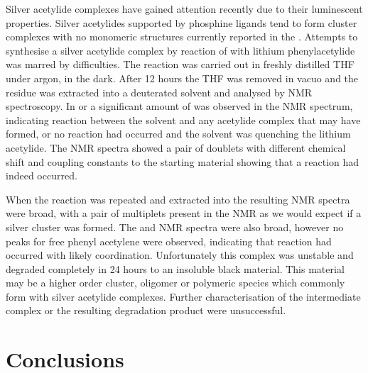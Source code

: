 Silver acetylide complexes have gained attention recently due to their luminescent properties.\cite{Yam1997, Yam1998, Xu2013}  Silver acetylides supported by phosphine ligands tend to form cluster complexes with no monomeric structures currently reported in the .  Attempts to synthesise a silver acetylide complex by reaction of  with lithium phenylacetylide was marred by difficulties.  The reaction was carried out in freshly distilled THF under argon, in the dark.  After 12 hours the THF was removed in vacuo and the residue was extracted into a deuterated solvent and analysed by NMR spectroscopy.  In  or  a significant amount of  was observed in the \carbon{} NMR spectrum, indicating reaction between the solvent and any acetylide complex that may have formed, or no reaction had occurred and the solvent was quenching the lithium acetylide.  The \phosphorus{} NMR spectra showed a pair of doublets with different chemical shift and coupling constants to the starting material showing that a reaction had indeed occurred. 

When the reaction was repeated and extracted into  the resulting NMR spectra were broad, with a pair of multiplets present in the \phosphorus{} NMR as we would expect if a silver cluster was formed.  The \proton{} and \carbon{} NMR spectra were also broad, however no peaks for free phenyl acetylene were observed, indicating that reaction had occurred with likely coordination.  Unfortunately this complex was unstable and degraded completely in 24 hours to an insoluble black material.  This material may be a higher order cluster, oligomer or polymeric species which commonly form with silver acetylide complexes.  Further characterisation of the intermediate complex or the resulting degradation product were unsuccessful.

\section{Conclusions}





